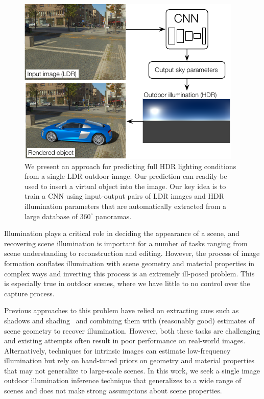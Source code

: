 
\begin{figure}
\centering
\includegraphics[width=\linewidth]{figures/teaser/teaser-skymodel.pdf}
\caption[Presentation of the proposed method]{We present an approach for predicting full HDR lighting conditions from a single LDR outdoor image. Our prediction can readily be used to insert a virtual object into the image. Our key idea is to train a CNN using input-output pairs of LDR images and HDR illumination parameters that are automatically extracted from a large database of $360^\circ$ panoramas.}
\label{fig:teaser}
\vspace{-1em}
\end{figure}

Illumination plays a critical role in deciding the appearance of a scene, and recovering scene illumination is important for a number of tasks ranging from scene understanding to reconstruction and editing. However, the process of image formation conflates illumination with scene geometry and material properties in complex ways and inverting this process is an extremely ill-posed problem. This is especially true in outdoor scenes, where we have little to no control over the capture process.

Previous approaches to this problem have relied on extracting cues such as shadows and shading~\cite{lalonde-ijcv-12} and combining them with (reasonably good) estimates of scene geometry to recover illumination. However, both these tasks are challenging and existing attempts often result in poor performance on real-world images. Alternatively, techniques for intrinsic images can estimate low-frequency illumination but rely on hand-tuned priors on geometry and material properties~\cite{barron-pami-15,lombardi2016reflectance} that may not generalize to large-scale scenes. In this work, we seek a single image outdoor illumination inference technique that generalizes to a wide range of scenes and does not make strong assumptions about scene properties.

